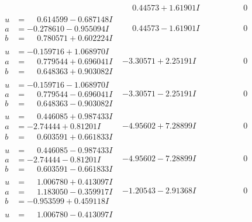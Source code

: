\documentclass[1p]{elsarticle_modified}
\theoremstyle{definition}
\begin{document}
$$\begin{array}{c|c|c}
 & \phantom{-}0.44573 + 1.61901 I & \phantom{-0.000000 } 0 \\ \hline\begin{aligned}
u &= \phantom{-}0.614599 - 0.687148 I \\
a &= -0.278610 - 0.955094 I \\
b &= \phantom{-}0.780571 + 0.602224 I\end{aligned}
 & \phantom{-}0.44573 - 1.61901 I & \phantom{-0.000000 } 0 \\ \hline\begin{aligned}
u &= -0.159716 + 1.068970 I \\
a &= \phantom{-}0.779544 + 0.696041 I \\
b &= \phantom{-}0.648363 + 0.903082 I\end{aligned}
 & -3.30571 + 2.25191 I & \phantom{-0.000000 } 0 \\ \hline\begin{aligned}
u &= -0.159716 - 1.068970 I \\
a &= \phantom{-}0.779544 - 0.696041 I \\
b &= \phantom{-}0.648363 - 0.903082 I\end{aligned}
 & -3.30571 - 2.25191 I & \phantom{-0.000000 } 0 \\ \hline\begin{aligned}
u &= \phantom{-}0.446085 + 0.987433 I \\
a &= -2.74444 + 0.81201 I \\
b &= \phantom{-}0.603591 + 0.661833 I\end{aligned}
 & -4.95602 + 7.28899 I & \phantom{-0.000000 } 0 \\ \hline\begin{aligned}
u &= \phantom{-}0.446085 - 0.987433 I \\
a &= -2.74444 - 0.81201 I \\
b &= \phantom{-}0.603591 - 0.661833 I\end{aligned}
 & -4.95602 - 7.28899 I & \phantom{-0.000000 } 0 \\ \hline\begin{aligned}
u &= \phantom{-}1.006780 + 0.413097 I \\
a &= \phantom{-}1.183050 - 0.359917 I \\
b &= -0.953599 + 0.459118 I\end{aligned}
 & -1.20543 - 2.91368 I & \phantom{-0.000000 } 0 \\ \hline\begin{aligned}
u &= \phantom{-}1.006780 - 0.413097 I \\

\end{aligned}
\end{array}$$
\end{document}
